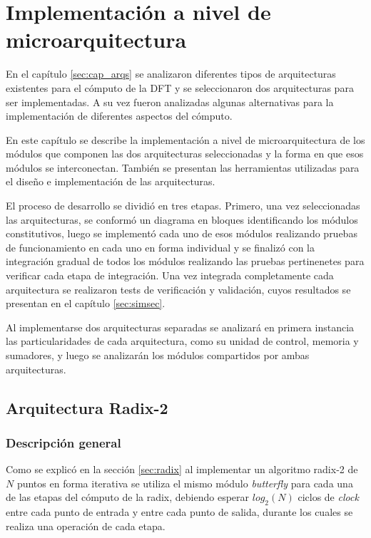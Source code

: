 \chapter{Implementación a nivel de microarquitectura}

En el capítulo \ref{sec:cap_arqs} se analizaron diferentes tipos de arquitecturas existentes para el
cómputo de la DFT y se seleccionaron dos arquitecturas para ser implementadas. A su vez fueron analizadas
algunas alternativas para la implementación de diferentes aspectos del cómputo.

En este capítulo se describe la implementación a nivel de microarquitectura de los
módulos que componen las dos arquitecturas seleccionadas y la forma en que esos módulos se
interconectan. También se presentan las herramientas utilizadas para el diseño e implementación
de las arquitecturas.

El proceso de desarrollo se dividió en tres etapas. Primero, una vez seleccionadas las
arquitecturas, se conformó un diagrama en bloques identificando los módulos constitutivos, luego se implementó cada
uno de esos módulos realizando pruebas de funcionamiento en cada uno en forma individual y se
finalizó con la integración gradual de todos los módulos realizando las pruebas pertinenetes para
verificar cada etapa de integración. Una vez integrada completamente cada arquitectura se realizaron
tests de verificación y validación, cuyos resultados se presentan en el capítulo \ref{sec:simsec}.

Al implementarse dos arquitecturas separadas se analizará en primera instancia las particularidades
de cada arquitectura, como su unidad de control, memoria y sumadores, y luego se
analizarán los módulos compartidos por ambas arquitecturas.

\section{Arquitectura Radix-2}

\subsection{Descripción general}

Como se explicó en la sección \ref{sec:radix} al implementar un algoritmo radix-2 de $N$ puntos en
forma iterativa se utiliza el mismo módulo \textit{butterfly} para cada una de las etapas del cómputo de
la radix, debiendo esperar $log_2(N)$ ciclos de \textit{clock} entre cada punto de entrada y entre
cada punto de salida, durante los cuales se realiza una operación de cada etapa.

